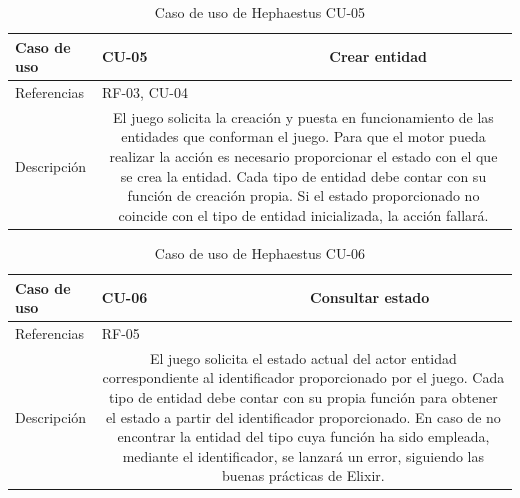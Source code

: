 \begin{table}[H]
	\centering
	\small
	\begin{tabularx}{\linewidth}{|l|cc|}
		\hline
		{\cellcolor[HTML]{C0C0C0} Caso de uso} & \multicolumn{1}{l|}{CU-05} & Crear entidad \\ \hline
		{\cellcolor[HTML]{C0C0C0} Referencias} & \multicolumn{2}{l|}{RF-03, CU-04} \\ \hline
		{\cellcolor[HTML]{C0C0C0} Descripción} & \multicolumn{2}{X|}{El juego solicita la creación y puesta en funcionamiento de las entidades que conforman el juego. Para que el motor pueda realizar la acción es necesario proporcionar el estado con el que se crea la entidad. Cada tipo de entidad debe contar con su función de creación propia. Si el estado proporcionado no coincide con el tipo de entidad inicializada, la acción fallará.} \\ \hline
	\end{tabularx}
	
	\vspace{0.5cm}
	\caption{Caso de uso de Hephaestus CU-05}
	\label{tab:hephaestus-cu-05}
\end{table}

\begin{table}[H]
	\centering
	\small
	\begin{tabularx}{\linewidth}{|l|cc|}
		\hline
		{\cellcolor[HTML]{C0C0C0} Caso de uso} & \multicolumn{1}{l|}{CU-06} & Consultar estado \\ \hline
		{\cellcolor[HTML]{C0C0C0} Referencias} & \multicolumn{2}{l|}{RF-05} \\ \hline
		{\cellcolor[HTML]{C0C0C0} Descripción} & \multicolumn{2}{X|}{El juego solicita el estado actual del actor entidad correspondiente al identificador proporcionado por el juego. Cada tipo de entidad debe contar con su propia función para obtener el estado a partir del identificador proporcionado. En caso de no encontrar la entidad del tipo cuya función ha sido empleada, mediante el identificador, se lanzará un error, siguiendo las buenas prácticas de Elixir.} \\ \hline
	\end{tabularx}
	
	\vspace{0.5cm}
	\caption{Caso de uso de Hephaestus CU-06}
	\label{tab:hephaestus-cu-06}
\end{table}

